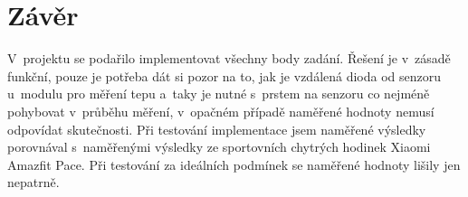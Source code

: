 \documentclass[a4paper, 11pt, twocolumn]{article}
\begin{document}
	\section{Závěr}

	V~projektu se podařilo implementovat všechny body zadání. Řešení je
	v~zásadě funkční, pouze je potřeba dát si pozor na to, jak je vzdálená
	dioda od senzoru u~modulu pro měření tepu a~taky je nutné s~prstem na
	senzoru co nejméně pohybovat v~průběhu měření, v~opačném případě naměřené
	hodnoty nemusí odpovídat skutečnosti. Při testování implementace jsem
	naměřené výsledky porovnával s~naměřenými výsledky ze sportovních
	chytrých hodinek Xiaomi Amazfit Pace. Při testování za ideálních podmínek
	se naměřené hodnoty lišily jen nepatrně.



	
	\renewcommand{\refname}{Literatura}
	
\end{document}

